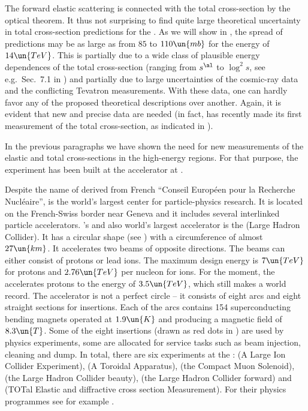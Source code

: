 The forward elastic scattering is connected with the total cross-section by the optical theorem. It thus not surprising to find quite large theoretical uncertainty in total cross-section predictions for the . As we will show in , the spread of predictions may be as large as from $85$ to $110\un{mb}$ for the energy of $14\un{TeV}$. This is partially due to a wide class of plausible energy dependences of the total cross-section (ranging from $s^{\al}$ to $\log^2 s$, see e.g.~Sec.~7.1 in ) and partially due to large uncertainties of the cosmic-ray data and the conflicting Tevatron measurements. With these data, one can hardly favor any of the proposed theoretical descriptions over another. Again, it is evident that new and precise data are needed (in fact,  has recently made its first measurement of the total cross-section, as indicated in ).

In the previous paragraphs we have shown the need for new measurements of the elastic and total cross-sections in the high-energy regions. For that purpose, the  experiment has been built at the  accelerator at .

Despite the name of  derived from French ``Conseil Europ\' een pour la Recherche Nucl\' eaire'',   is the world's largest center for particle-physics research. It is located on the French-Swiss border near Geneva and it includes several interlinked particle accelerators. 's and also world's largest accelerator is the   (Large Hadron Collider). It has a circular shape (see ) with a circumference of almost $27\un{km}$. It accelerates two beams of opposite directions. The beams can either consist of protons or lead ions. The maximum design energy is $7\un{TeV}$ for protons and $2.76\un{TeV}$ per nucleon for ions. For the moment, the  accelerates protons to the energy of $3.5\un{TeV}$, which still makes a world record. The accelerator is not a perfect circle -- it consists of eight arcs and eight straight sections for insertions. Each of the arcs contains 154 superconducting bending magnets operated at $1.9\un{K}$ and producing a magnetic field of $8.3\un{T}$. Some of the eight insertions (drawn as red dots in ) are used by physics experiments, some are allocated for service tasks such as beam injection, cleaning and dump. In total, there are six experiments at the :  (A Large Ion Collider Experiment),  (A Toroidal  Apparatus),  (the Compact Muon Solenoid),  (the Large Hadron Collider beauty),  (the Large Hadron Collider forward) and  (TOTal Elastic and diffractive cross section Measurement). For their physics programmes see for example .


